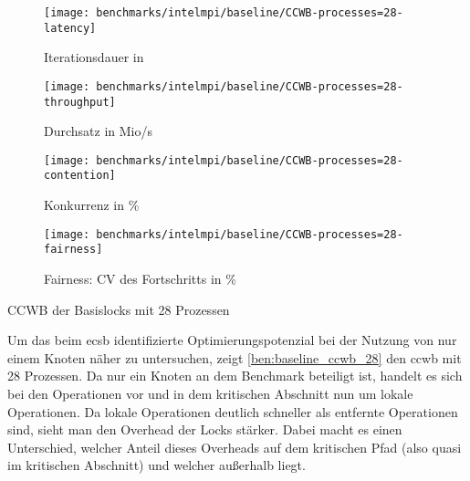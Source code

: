 \begin{benchmark}[h]
    \begin{subfigure}{.5\textwidth}
        \texttt{[image: benchmarks/intelmpi/baseline/CCWB-processes=28-latency]}
        \caption{Iterationsdauer in }
        \label{ben:baseline_ccwb_28_latency}
    \end{subfigure}
    \begin{subfigure}{.5\textwidth}
        \texttt{[image: benchmarks/intelmpi/baseline/CCWB-processes=28-throughput]}
        \caption{Durchsatz in Mio/s}
        \label{ben:baseline_ccwb_28_throughput}
    \end{subfigure}
    \begin{subfigure}{.5\textwidth}
        \texttt{[image: benchmarks/intelmpi/baseline/CCWB-processes=28-contention]}
        \caption{Konkurrenz in \%}
        \label{ben:baseline_ccwb_28_contention}
    \end{subfigure}
    \begin{subfigure}{.5\textwidth}
        \texttt{[image: benchmarks/intelmpi/baseline/CCWB-processes=28-fairness]}
        \caption{Fairness: CV des Fortschritts in \%}
        \label{ben:baseline_ccwb_28_fairness}
    \end{subfigure}
    \caption{CCWB der Basislocks mit 28 Prozessen}
    \label{ben:baseline_ccwb_28}
\end{benchmark}

Um das beim \gls{ecsb} identifizierte Optimierungspotenzial
bei der Nutzung von nur einem Knoten näher zu untersuchen,
zeigt \autoref{ben:baseline_ccwb_28} den \gls{ccwb} mit 28 Prozessen.
Da nur ein Knoten an dem Benchmark beteiligt ist,
handelt es sich bei den Operationen vor und in dem kritischen Abschnitt nun um lokale Operationen.
Da lokale Operationen deutlich schneller als entfernte Operationen sind,
sieht man den Overhead der Locks stärker.
Dabei macht es einen Unterschied,
welcher Anteil dieses Overheads auf dem kritischen Pfad (also quasi im kritischen Abschnitt)
und welcher außerhalb liegt.

